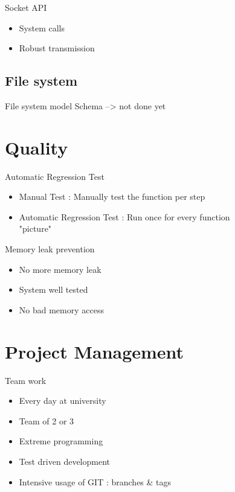 \documentclass{beamer}
\begin{document}
\begin{frame}{Socket API}
  \begin{itemize}
    \item System calls  
    \item Robust transmission
  \end{itemize}
\end{frame}

\subsection{File system}
\begin{frame}{File system model}
    Schema --> not done yet
\end{frame}

\section{Quality}
\begin{frame}{Automatic Regression Test}
  \begin{itemize}
    \item Manual Test : Manually test the function per step
    \item Automatic Regression Test : Run once for every function
    \\"picture"
  \end{itemize}
\end{frame}

\begin{frame}{Memory leak prevention}
  \begin{itemize}
    \item No more memory leak
    \item System well tested
    \item No bad memory access
  \end{itemize}
\end{frame}

\section{Project Management}
\begin{frame}{Team work}
   \begin{itemize}
       \item Every day at university
       \item Team of 2 or 3
       \item Extreme programming
       \item Test driven development
       \item Intensive usage of GIT : branches \& tags
   \end{itemize} 
\end{frame}
\end{document}
